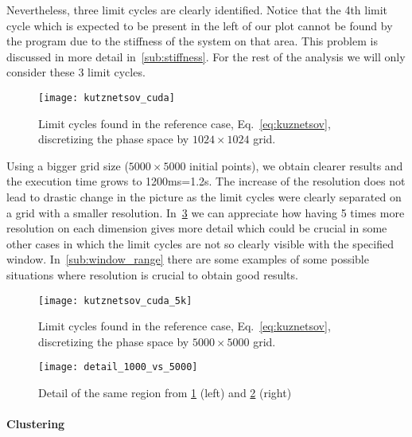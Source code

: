 Nevertheless, three limit cycles are clearly identified. Notice that the
4th limit cycle which is expected to be present in the left of our plot cannot be found by the program due to the stiffness of the system on that area. This problem is discussed in more detail in~\cref{sub:stiffness}. For the rest of the analysis we will only consider these 3 limit cycles.
\begin{figure}[H]
    \centering
    \texttt{[image: kutznetsov\_cuda]}
    \caption{Limit cycles found in the reference case, Eq.~\ref{eq:kuznetsov}, discretizing the phase space by $1024\times 1024$ grid.
    }
    \label{fig:kuznetsov_cuda}
\end{figure}

Using a bigger grid size ($5000\times5000$ initial points), we obtain clearer results and the execution time grows to 1200ms=1.2s.
The increase of the resolution does not lead to drastic change in the picture as
the limit cycles were clearly separated on a grid with a smaller resolution.
In~\cref{fig:detail1kvs5k} we can appreciate how having 5 times more resolution on each dimension
gives more detail which could be crucial
in some other cases in which the limit cycles are not so clearly visible with the specified window.
In~\cref{sub:window_range} there are some examples of some possible situations where resolution is crucial to obtain good results.

\begin{figure}[H]
\centering
\texttt{[image: kutznetsov\_cuda\_5k]}
\caption{Limit cycles found in the reference case, Eq.~\ref{eq:kuznetsov}, discretizing the phase space by $5000\times 5000$ grid.
}
\label{fig:kuznetsov_cuda_5k}
\end{figure}

\begin{figure}[H]
\centering
\texttt{[image: detail\_1000\_vs\_5000]}
\caption{Detail of the same region from \cref{fig:kuznetsov_cuda} (left) and \cref{fig:kuznetsov_cuda_5k} (right)
}
\label{fig:detail1kvs5k}
\end{figure}

\paragraph{Clustering}

